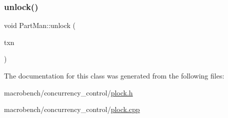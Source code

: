 \mbox{\label{classPartMan_a226ba688ef0fb09259d174a3a46576a4}} 
\subsubsection{\texorpdfstring{unlock()}{unlock()}}
{\footnotesize\ttfamily void Part\+Man\+::unlock (\begin{DoxyParamCaption}\item[{\hyperlink{classtxn__man}{txn\+\_\+man} $\ast$}]{txn }\end{DoxyParamCaption})}



The documentation for this class was generated from the following files\+:\begin{DoxyCompactItemize}
\item 
macrobench/concurrency\+\_\+control/\hyperlink{plock_8h}{plock.\+h}\item 
macrobench/concurrency\+\_\+control/\hyperlink{plock_8cpp}{plock.\+cpp}\end{DoxyCompactItemize}
